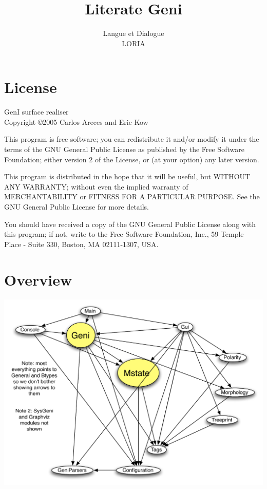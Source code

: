 \documentclass[a4paper,11pt]{report}
\begin{document}
\title{Literate Geni}
\author{Langue et Dialogue\\LORIA}

\maketitle
\tableofcontents


\chapter*{License}

GenI surface realiser\\
Copyright \copyright 2005 Carlos Areces and Eric Kow

\bigskip

This program is free software; you can redistribute it and/or
modify it under the terms of the GNU General Public License
as published by the Free Software Foundation; either version 2
of the License, or (at your option) any later version.

\bigskip

This program is distributed in the hope that it will be useful,
but WITHOUT ANY WARRANTY; without even the implied warranty of
MERCHANTABILITY or FITNESS FOR A PARTICULAR PURPOSE.  See the
GNU General Public License for more details.

\bigskip

You should have received a copy of the GNU General Public License
along with this program; if not, write to the Free Software
Foundation, Inc., 59 Temple Place - Suite 330, Boston, MA  02111-1307, USA.

\chapter{Overview}

\begin{center}
\includegraphics[scale=0.5]{images/genidep}
\end{center}
\end{document}
